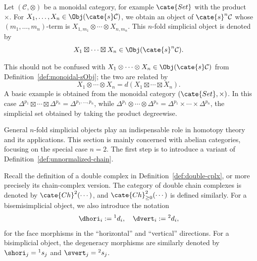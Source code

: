 \begin{example}\label{eg:boxtimes-bisimplicial}
	Let $(\mathcal{C},\otimes)$ be a monoidal category, for example
	$\cate{Set}$ with the product $\times$. For
	$X_1,\ldots,X_n\in\Obj(\cate{s}\mathcal{C})$, we obtain an object of
	$\cate{s}^n\mathcal{C}$ whose $(m_1,\ldots,m_n)$-term is
	$X_{1,m_1}\otimes\cdots\otimes X_{n,m_n}$. This $n$-fold simplicial
	object is denoted by
	\[ X_1 \boxtimes \cdots \boxtimes X_n \in \Obj(\cate{s}^n \mathcal{C}). \]

	This should not be confused with
	$X_1\otimes\cdots\otimes X_n\in\Obj(\cate{s}\mathcal{C})$ from
	Definition~\ref{def:monoidal-sObj}; the two are related by
	\[ X_1 \otimes \cdots \otimes X_n = d(X_1 \boxtimes \cdots \boxtimes X_n). \]
	A basic example is obtained from the monoidal category
	$(\cate{Set},\times)$. In this case
	$\Delta^{p_1}\boxtimes\cdots\boxtimes\Delta^{p_n}
	=\Delta^{p_1,\ldots,p_n}$, while
	$\Delta^{p_1}\otimes\cdots\otimes\Delta^{p_n}
	=\Delta^{p_1}\times\cdots\times\Delta^{p_n}$, the simplicial set
	obtained by taking the product degreewise.
\end{example}

General $n$-fold simplicial objects play an indispensable role in homotopy
theory and its applications. This section is mainly concerned with abelian
categories, focusing on the special case $n=2$. The first step is to
introduce a variant of Definition~\ref{def:unnormalized-chain}.

Recall the definition of a double complex in
Definition~\ref{def:double-cplx}, or more precisely its chain-complex
version. The category of double chain complexes is denoted by
$\cate{Ch}^2(\cdots)$, and $\cate{Ch}^2_{\geq0}(\cdots)$ is defined
similarly. For a bisemisimplicial object, we also introduce the notation
\[ \dhori_i := {}^1 d_i , \quad \dvert_i := {}^2 d_i, \]
for the face morphisms in the ``horizontal'' and ``vertical'' directions.
For a bisimplicial object, the degeneracy morphisms are similarly denoted by
$\shori_j={}^1s_j$ and $\svert_j={}^2s_j$.

